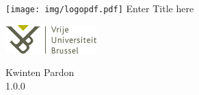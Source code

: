 \documentclass[12pt]{article}
\newcommand{\DocumentName}{Enter Title here}
\newcommand{\Title}{\DocumentName \\ \hfill}
\newcommand{\Author}{Kwinten Pardon}
\newcommand{\Version}{1.0.0}
\begin{document}
\begin{titlepage}

\begin{center}
\texttt{[image: img/logopdf.pdf]}
\vfill
{\Huge \Title}
\hfill
\vfill
\vfill
\end{center}

\begin{minipage}[t]{1\textwidth}
\begin{flushleft}
\includegraphics[width=100pt]{img/VUB_logo_compact.jpg}
\end{flushleft}
\end{minipage}

\begin{minipage}[t]{1\textwidth}
\begin{flushright}
\Author \\
\Version \\
\end{flushright}
\end{minipage}

\end{titlepage}
\end{document}
